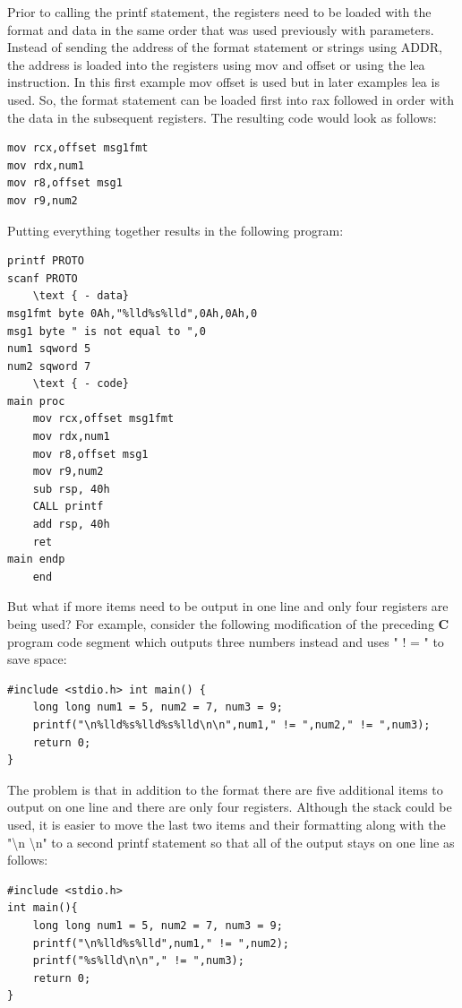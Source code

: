 \documentclass[10pt]{book}
\begin{document}
Prior to calling the printf statement, the registers need to be loaded with the format and data in the same order that was used previously with parameters. Instead of sending the address of the format statement or strings using ADDR, the address is loaded into the registers using mov and offset or using the lea instruction. In this first example mov offset is used but in later examples lea is used. So, the format statement can be loaded first into rax followed in order with the data in the subsequent registers. The resulting code would look as follows:

\begin{verbatim}
mov rcx,offset msg1fmt
mov rdx,num1
mov r8,offset msg1
mov r9,num2
\end{verbatim}

Putting everything together results in the following program:

\begin{verbatim}
printf PROTO
scanf PROTO
    \text { - data}
msg1fmt byte 0Ah,"%lld%s%lld",0Ah,0Ah,0
msg1 byte " is not equal to ",0
num1 sqword 5
num2 sqword 7
    \text { - code}
main proc
    mov rcx,offset msg1fmt
    mov rdx,num1
    mov r8,offset msg1
    mov r9,num2
    sub rsp, 40h
    CALL printf
    add rsp, 40h
    ret
main endp
    end
\end{verbatim}

But what if more items need to be output in one line and only four registers are being used? For example, consider the following modification of the preceding $\mathbf{C}$ program code segment which outputs three numbers instead and uses " ! = " to save space:

\begin{verbatim}
#include <stdio.h> int main() {
    long long num1 = 5, num2 = 7, num3 = 9;
    printf("\n%lld%s%lld%s%lld\n\n",num1," != ",num2," != ",num3);
    return 0;
}
\end{verbatim}

The problem is that in addition to the format there are five additional items to output on one line and there are only four registers. Although the stack could be used, it is easier to move the last two items and their formatting along with the "\textbackslash n \textbackslash n" to a second printf statement so that all of the output stays on one line as follows:

\begin{verbatim}
#include <stdio.h>
int main(){
    long long num1 = 5, num2 = 7, num3 = 9;
    printf("\n%lld%s%lld",num1," != ",num2);
    printf("%s%lld\n\n"," != ",num3);
    return 0;
}
\end{verbatim}
\end{document}

